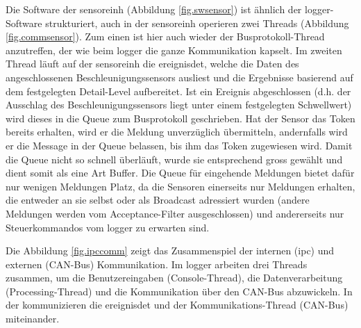 Die Software der \gls{sensoreinh} (Abbildung \ref{fig.swsensor}) ist ähnlich der \gls{logger}-Software strukturiert, auch in der \gls{sensoreinh} operieren zwei Threads (Abbildung \ref{fig.commsensor}). Zum einen ist hier auch wieder der Busprotokoll-Thread anzutreffen, der wie beim \gls{logger} die ganze Kommunikation kapselt. Im zweiten Thread läuft auf der \gls{sensoreinh} die \gls{ereignisdet}, welche die Daten des angeschlossenen Beschleunigungssensors ausliest und die Ergebnisse basierend auf dem festgelegten Detail-Level aufbereitet. Ist ein Ereignis abgeschlossen (d.h. der Ausschlag des Beschleunigungssensors liegt unter einem festgelegten Schwellwert) wird dieses in die Queue zum Busprotokoll geschrieben. Hat der Sensor das Token bereits erhalten, wird er die Meldung unverzüglich übermitteln, andernfalls wird er die Message in der Queue belassen, bis ihm das Token zugewiesen wird. Damit die Queue nicht so schnell überläuft, wurde sie entsprechend gross gewählt und dient somit als eine Art Buffer. Die Queue für eingehende Meldungen bietet dafür nur wenigen Meldungen Platz, da die Sensoren einerseits nur Meldungen erhalten, die entweder an sie selbst oder als Broadcast adressiert wurden (andere Meldungen werden vom Acceptance-Filter ausgeschlossen) und andererseits nur Steuerkommandos vom \gls{logger} zu erwarten sind.

Die Abbildung \ref{fig.ipccomm} zeigt das Zusammenspiel der internen (\gls{ipc}) und externen (CAN-Bus) Kommunikation. Im \gls{logger} arbeiten drei Threads zusammen, um die Benutzereingaben (Console-Thread), die Datenverarbeitung (Processing-Thread) und die Kommunikation über den CAN-Bus abzuwickeln. In der  kommunizieren die \gls{ereignisdet} und der Kommunikations-Thread (CAN-Bus) miteinander.

